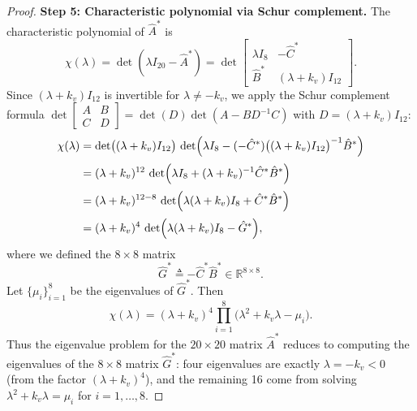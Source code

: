 \begin{proof}
\medskip\noindent\textbf{Step 5: Characteristic polynomial via Schur complement.}\quad
The characteristic polynomial of \(\hat A^*\) is
\begin{equation}
\chi(\lambda)=\det(\lambda I_{20}-\hat A^*)
=\det\begin{bmatrix}
\lambda I_{8} & -\hat C^*\\[2pt]
\hat B^* & (\lambda+k_v)I_{12}
\end{bmatrix}.
\label{eq:char-det}
\end{equation}
Since \((\lambda+k_v)I_{12}\) is invertible for \(\lambda\neq -k_v\), we apply the Schur complement formula \(\det\begin{bmatrix}A&B\\C&D\end{bmatrix}=\det(D)\det(A-BD^{-1}C)\) with \(D=(\lambda+k_v)I_{12}\):
\begin{equation}
\begin{aligned}
\chi(\lambda)
&=\det\bigl((\lambda+k_v)I_{12}\bigr)\,
\det\Bigl(\lambda I_{8}-(-\hat C^*)\bigl((\lambda+k_v)I_{12}\bigr)^{-1}\hat B^*\Bigr)\\[2pt]
&=(\lambda+k_v)^{12}\,
\det\Bigl(\lambda I_{8}+(\lambda+k_v)^{-1}\hat C^*\hat B^*\Bigr)\\[2pt]
&=(\lambda+k_v)^{12-8}\,
\det\Bigl(\lambda(\lambda+k_v)I_{8}+\hat C^*\hat B^*\Bigr)\\[2pt]
&=(\lambda+k_v)^{4}\,
\det\Bigl(\lambda(\lambda+k_v)I_{8}-\hat G^*\Bigr),
\end{aligned}
\label{eq:factorization}
\end{equation}
where we defined the \(8\times 8\) matrix
\begin{equation}
\hat G^* \triangleq -\hat C^*\hat B^* \in\mathbb R^{8\times 8}.
\label{eq:Gstar-def}
\end{equation}
Let \(\{\mu_i\}_{i=1}^{8}\) be the eigenvalues of \(\hat G^*\). Then
\begin{equation}
\boxed{\chi(\lambda)=(\lambda+k_v)^{4}\prod_{i=1}^{8}\bigl(\lambda^{2}+k_v\lambda-\mu_i\bigr)}.
\label{eq:char-poly}
\end{equation}
Thus the eigenvalue problem for the \(20\times 20\) matrix \(\hat A^*\) reduces to computing the eigenvalues of the \(8\times 8\) matrix \(\hat G^*\): four eigenvalues are exactly \(\lambda=-k_v<0\) (from the factor \((\lambda+k_v)^4\)), and the remaining 16 come from solving \(\lambda^{2}+k_v\lambda=\mu_i\) for \(i=1,\dots,8\).


\end{proof}
